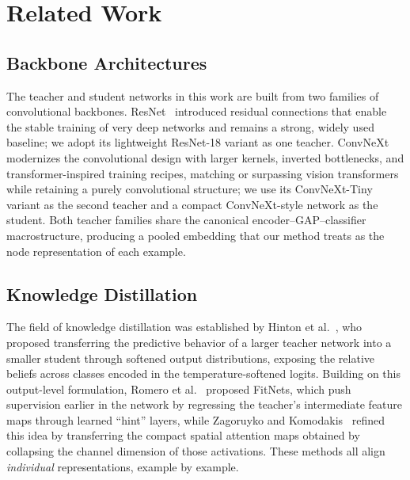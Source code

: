 \documentclass[11pt,letterpaper]{article}
\begin{document}
\section{Related Work}
\label{sec:related}

\subsection{Backbone Architectures}
\label{sec:related-backbones}

The teacher and student networks in this work are built from two families of
convolutional backbones. ResNet~\cite{he2016resnet} introduced residual
connections that enable the stable training of very deep networks and remains a
strong, widely used baseline; we adopt its lightweight ResNet-18 variant as one
teacher. ConvNeXt~\cite{liu2022convnext} modernizes the convolutional design with
larger kernels, inverted bottlenecks, and transformer-inspired training recipes,
matching or surpassing vision transformers while retaining a purely convolutional
structure; we use its ConvNeXt-Tiny variant as the second teacher and a compact
ConvNeXt-style network as the student. Both teacher families share the canonical
encoder--GAP--classifier macrostructure, producing a pooled embedding that our
method treats as the node representation of each example.

\subsection{Knowledge Distillation}
\label{sec:related-kd}

The field of knowledge distillation was established by Hinton et
al.~\cite{hinton2015distilling}, who proposed transferring the predictive behavior
of a larger teacher network into a smaller student through softened output
distributions, exposing the relative beliefs across classes encoded in the
temperature-softened logits. Building on this output-level formulation, Romero et
al.~\cite{romero2015fitnets} proposed FitNets, which push supervision earlier in
the network by regressing the teacher's intermediate feature maps through learned
``hint'' layers, while Zagoruyko and Komodakis~\cite{zagoruyko2017attention}
refined this idea by transferring the compact spatial attention maps obtained by
collapsing the channel dimension of those activations. These methods all align
\emph{individual} representations, example by example.
\end{document}
